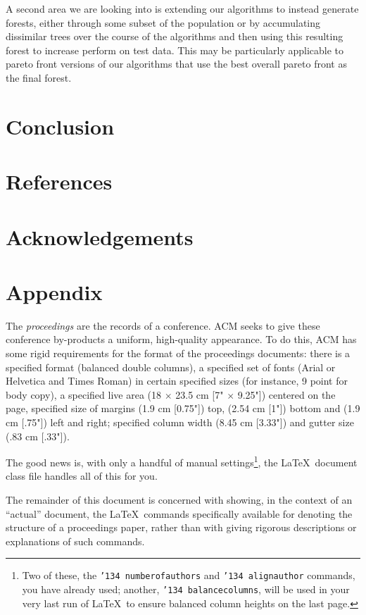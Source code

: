 \documentclass{acm_proc_article-sp}
\begin{document}
A second area we are looking into is extending our algorithms to instead generate forests, either through some subset of the population or by accumulating dissimilar trees over the course of the algorithms and then using this resulting forest to increase perform on test data. This may be particularly applicable to pareto front versions of our algorithms that use the best overall pareto front as the final forest.

\section{Conclusion}
\section{References}
\section{Acknowledgements}
\section{Appendix}


The \textit{proceedings} are the records of a conference.
ACM seeks to give these conference by-products a uniform,
high-quality appearance.  To do this, ACM has some rigid
requirements for the format of the proceedings documents: there
is a specified format (balanced  double columns), a specified
set of fonts (Arial or Helvetica and Times Roman) in
certain specified sizes (for instance, 9 point for body copy),
a specified live area (18 $\times$ 23.5 cm [7" $\times$ 9.25"]) centered on
the page, specified size of margins (1.9 cm [0.75"]) top, (2.54 cm [1"]) bottom
and (1.9 cm [.75"]) left and right; specified column width
(8.45 cm [3.33"]) and gutter size (.83 cm [.33"]).

The good news is, with only a handful of manual
settings\footnote{Two of these, the {\texttt{\char'134 numberofauthors}}
and {\texttt{\char'134 alignauthor}} commands, you have
already used; another, {\texttt{\char'134 balancecolumns}}, will
be used in your very last run of \LaTeX\ to ensure
balanced column heights on the last page.}, the \LaTeX\ document
class file handles all of this for you.

The remainder of this document is concerned with showing, in
the context of an ``actual'' document, the \LaTeX\ commands
specifically available for denoting the structure of a
proceedings paper, rather than with giving rigorous descriptions
or explanations of such commands.
\end{document}
